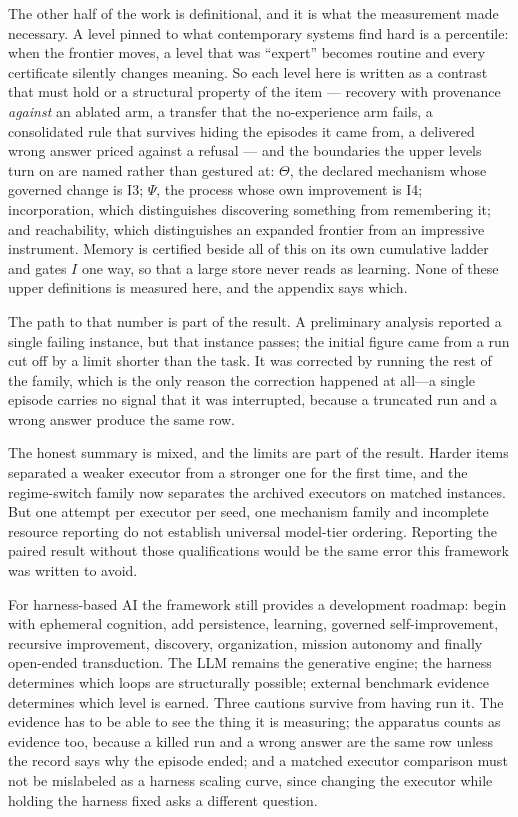 \documentclass[11pt]{article}
\theoremstyle{definition}
\begin{document}
The other half of the work is definitional, and it is what the measurement made necessary. A level pinned to what contemporary systems find hard is a percentile: when the frontier moves, a level that was ``expert'' becomes routine and every certificate silently changes meaning. So each level here is written as a contrast that must hold or a structural property of the item --- recovery with provenance \emph{against} an ablated arm, a transfer that the no-experience arm fails, a consolidated rule that survives hiding the episodes it came from, a delivered wrong answer priced against a refusal --- and the boundaries the upper levels turn on are named rather than gestured at: $\Theta$, the declared mechanism whose governed change is I3; $\Psi$, the process whose own improvement is I4; incorporation, which distinguishes discovering something from remembering it; and reachability, which distinguishes an expanded frontier from an impressive instrument. Memory is certified beside all of this on its own cumulative ladder and gates $I$ one way, so that a large store never reads as learning. None of these upper definitions is measured here, and the appendix says which.

The path to that number is part of the result. A preliminary analysis reported a single failing instance, but that instance passes; the initial figure came from a run cut off by a limit shorter than the task. It was corrected by running the rest of the family, which is the only reason the correction happened at all---a single episode carries no signal that it was interrupted, because a truncated run and a wrong answer produce the same row.

The honest summary is mixed, and the limits are part of the result. Harder items separated a weaker executor from a stronger one for the first time, and the regime-switch family now separates the archived executors on matched instances. But one attempt per executor per seed, one mechanism family and incomplete resource reporting do not establish universal model-tier ordering. Reporting the paired result without those qualifications would be the same error this framework was written to avoid.

For harness-based AI the framework still provides a development roadmap: begin with ephemeral cognition, add persistence, learning, governed self-improvement, recursive improvement, discovery, organization, mission autonomy and finally open-ended transduction. The LLM remains the generative engine; the harness determines which loops are structurally possible; external benchmark evidence determines which level is earned. Three cautions survive from having run it. The evidence has to be able to see the thing it is measuring; the apparatus counts as evidence too, because a killed run and a wrong answer are the same row unless the record says why the episode ended; and a matched executor comparison must not be mislabeled as a harness scaling curve, since changing the executor while holding the harness fixed asks a different question.
\end{document}
